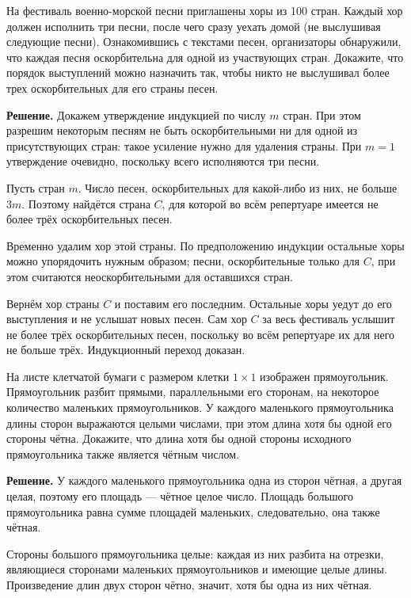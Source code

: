 \begin{problems}
\item На фестиваль военно-морской песни приглашены хоры из 100 стран. Каждый хор должен исполнить три песни, после чего сразу уехать домой (не выслушивая следующие песни). Ознакомившись с текстами песен, организаторы обнаружили, что каждая песня оскорбительна для одной из участвующих стран. Докажите, что порядок выступлений можно назначить так, чтобы никто не выслушивал более трех оскорбительных для его страны песен.
\par\smallskip\noindent\textbf{Решение.} Докажем утверждение индукцией по числу $m$ стран. При этом разрешим некоторым песням не быть оскорбительными ни для одной из присутствующих стран: такое усиление нужно для удаления страны. При $m=1$ утверждение очевидно, поскольку всего исполняются три песни.
\par Пусть стран $m$. Число песен, оскорбительных для какой-либо из них, не больше $3m$. Поэтому найдётся страна $C$, для которой во всём репертуаре имеется не более трёх оскорбительных песен.
\par Временно удалим хор этой страны. По предположению индукции остальные хоры можно упорядочить нужным образом; песни, оскорбительные только для $C$, при этом считаются неоскорбительными для оставшихся стран.
\par Вернём хор страны $C$ и поставим его последним. Остальные хоры уедут до его выступления и не услышат новых песен. Сам хор $C$ за весь фестиваль услышит не более трёх оскорбительных песен, поскольку во всём репертуаре их для него не больше трёх. Индукционный переход доказан.\par

\item На листе клетчатой бумаги с размером клетки $1\times1$ изображен прямоугольник. Прямоугольник разбит прямыми, параллельными его сторонам, на некоторое количество маленьких прямоугольников. У каждого маленького прямоугольника длины сторон выражаются целыми числами, при этом длина хотя бы одной его стороны чётна. Докажите, что длина хотя бы одной стороны исходного прямоугольника также является чётным числом.
\par\smallskip\noindent\textbf{Решение.} У каждого маленького прямоугольника одна из сторон чётная, а другая целая, поэтому его площадь --- чётное целое число. Площадь большого прямоугольника равна сумме площадей маленьких, следовательно, она также чётная.
\par Стороны большого прямоугольника целые: каждая из них разбита на отрезки, являющиеся сторонами маленьких прямоугольников и имеющие целые длины. Произведение длин двух сторон чётно, значит, хотя бы одна из них чётная.\par


\end{problems}
